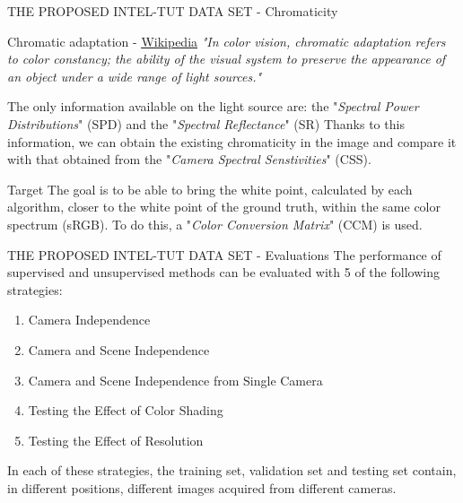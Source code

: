 \begin{frame}{THE PROPOSED INTEL-TUT DATA SET - Chromaticity}
    \begin{block}{Chromatic adaptation - \href{https://en.wikipedia.org/wiki/Color_vision}{\underline{Wikipedia}}}
        \emph{"In color vision, chromatic adaptation refers to color constancy; the 
        ability of the visual system to preserve the appearance of an object under 
        a wide range of light sources."}
    \end{block}
    The only information available on the light source are: the "\emph{Spectral 
    Power Distributions}" (SPD) and the "\emph{Spectral Reflectance}" (SR)
    Thanks to this information, we can obtain the existing chromaticity in the image 
    and compare it with that obtained from the "\emph{Camera Spectral Senstivities}" (CSS).
    \begin{block}{Target}
        The goal is to be able to bring the white point, calculated by each 
        algorithm, closer to the white point of the ground truth, within the same 
        color spectrum (sRGB). To do this, a "\emph{Color Conversion Matrix}" (CCM) 
        is used.
    \end{block}
\end{frame}

\begin{frame}{THE PROPOSED INTEL-TUT DATA SET - Evaluations}
    The performance of supervised and unsupervised methods can be 
    evaluated with 5 of the following strategies:
    \begin{enumerate}
        \item Camera Independence \label{CI}
        \item Camera and Scene Independence
        \item Camera and Scene Independence from Single Camera
        \item Testing the Effect of Color Shading
        \item Testing the Effect of Resolution
    \end{enumerate}
    In each of these strategies, the training set, validation set and testing 
    set contain, in different positions, different images acquired from different 
    cameras.
\end{frame}

